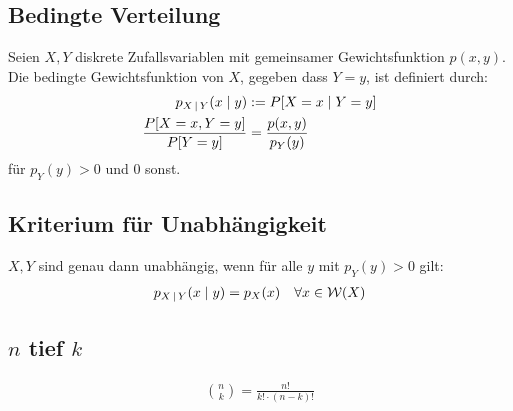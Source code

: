 \subsection*{Bedingte Verteilung}
Seien $X, Y$ diskrete Zufallsvariablen mit gemeinsamer Gewichtsfunktion $p (x,
  y)$. Die bedingte Gewichtsfunktion von $X$, gegeben dass $Y = y$, ist definiert
durch:
\begin{align*}
  p_{X \, | \, Y} (x \; | \; y)    & := P[X = x \; | \; Y = y]     \\
  \frac{P[X = x, Y = y]}{P[Y = y]} & = \frac{p (x, y)}{p_Y (y)}
\end{align*}
für $p_Y (y) > 0$ und $0$ sonst.
\subsection*{Kriterium für Unabhängigkeit}
$X, Y$ sind genau dann unabhängig, wenn für alle $y$ mit $p_Y (y) > 0$
gilt:
\begin{align*}
  p_{X\,|\,Y} (x \; | \; y) = p_X (x) &  & \forall x \in \mathcal{W} (X)
\end{align*}
\subsection*{$n$ tief $k$}
\begin{align*}
  \binom{n}{k} = \frac{n!}{k! \cdot  (n - k)!}
\end{align*}
